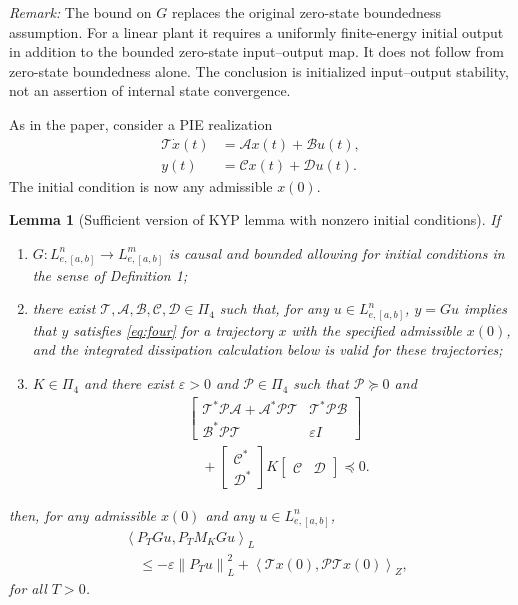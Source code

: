 \documentclass[10pt,twocolumn,letterpaper]{article}
\newtheorem{lemma}{Lemma}
\theoremstyle{definition}
\theoremstyle{plain}
\newcommand{\col}[1]{\begin{bmatrix}#1\end{bmatrix}}
\newcommand{\ip}[2]{\left\langle #1,#2\right\rangle}
\newcommand{\norm}[1]{\left\lVert #1\right\rVert}
\newcommand{\TT}{\mathcal T}
\newcommand{\opA}{\mathcal A}
\newcommand{\opB}{\mathcal B}
\newcommand{\opC}{\mathcal C}
\newcommand{\opD}{\mathcal D}
\newcommand{\opP}{\mathcal P}
\begin{document}
\noindent\emph{Remark:}
The bound on $G$ replaces the original zero-state boundedness assumption.
For a linear plant it requires a uniformly finite-energy initial output
in addition to the bounded zero-state input--output map. It does not
follow from zero-state boundedness alone. The conclusion is initialized
input--output stability, not an assertion of internal state convergence.

\medskip
\noindent
As in the paper, consider a PIE realization
\begin{equation}\label{eq:four}
 \begin{aligned}
 \TT\dot x(t)&=\opA x(t)+\opB u(t),\\
 y(t)&=\opC x(t)+\opD u(t).
 \end{aligned}
\end{equation}
The initial condition is now any admissible $x(0)$.

\begin{lemma}[Sufficient version of KYP lemma with nonzero initial conditions]
If
\begin{enumerate}
\item $G:L^n_{e,[a,b]}\to L^m_{e,[a,b]}$ is causal and bounded allowing
for initial conditions in the sense of Definition 1;
\item there exist $\TT,\opA,\opB,\opC,\opD\in\Pi_4$ such that, for any
$u\in L^n_{e,[a,b]}$, $y=Gu$ implies that $y$ satisfies
\eqref{eq:four} for a trajectory $x$ with the specified admissible
$x(0)$, and the integrated dissipation calculation below is valid
for these trajectories;
\item $K\in\Pi_4$ and there exist $\varepsilon>0$ and
$\opP\in\Pi_4$ such that $\opP\succeq0$ and
\begin{equation}\label{eq:five}
\begin{aligned}
 &\col{\TT^*\opP\opA+\opA^*\opP\TT&
                       \TT^*\opP\opB\\
        \opB^*\opP\TT&\varepsilon I}\\
 &\quad+\col{\opC^*\\\opD^*}
             K\begin{bmatrix}\opC&\opD\end{bmatrix}
 \preceq0.
\end{aligned}
\end{equation}
\end{enumerate}
then, for any admissible $x(0)$ and any
$u\in L^n_{e,[a,b]}$,
\begin{equation*}
 \begin{aligned}
 &\ip{P_TGu}{P_TM_KGu}_L\\
 &\quad\leq-\varepsilon\norm{P_Tu}_L^2
       +\ip{\TT x(0)}{\opP\TT x(0)}_Z,
 \end{aligned}
\end{equation*}
for all $T>0$.
\end{lemma}
\end{document}
